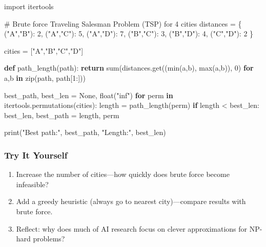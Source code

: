 \documentclass[
  letterpaper,
  DIV=11,
  numbers=noendperiod]{scrreprt}
\newenvironment{Shaded}{\begin{snugshade}}{\end{snugshade}}
\newcommand{\BuiltInTok}[1]{\textcolor[rgb]{0.00,0.23,0.31}{#1}}
\newcommand{\CommentTok}[1]{\textcolor[rgb]{0.37,0.37,0.37}{#1}}
\newcommand{\ControlFlowTok}[1]{\textcolor[rgb]{0.00,0.23,0.31}{\textbf{#1}}}
\newcommand{\DecValTok}[1]{\textcolor[rgb]{0.68,0.00,0.00}{#1}}
\newcommand{\ImportTok}[1]{\textcolor[rgb]{0.00,0.46,0.62}{#1}}
\newcommand{\KeywordTok}[1]{\textcolor[rgb]{0.00,0.23,0.31}{\textbf{#1}}}
\newcommand{\NormalTok}[1]{\textcolor[rgb]{0.00,0.23,0.31}{#1}}
\newcommand{\OperatorTok}[1]{\textcolor[rgb]{0.37,0.37,0.37}{#1}}
\newcommand{\StringTok}[1]{\textcolor[rgb]{0.13,0.47,0.30}{#1}}
\newcommand{\VariableTok}[1]{\textcolor[rgb]{0.07,0.07,0.07}{#1}}
\providecommand{\tightlist}{%
  \setlength{\itemsep}{0pt}\setlength{\parskip}{0pt}}
\begin{document}
\begin{Shaded}
\begin{Highlighting}[]
\ImportTok{import}\NormalTok{ itertools}

\CommentTok{\# Brute force Traveling Salesman Problem (TSP) for 4 cities}
\NormalTok{distances }\OperatorTok{=}\NormalTok{ \{}
\NormalTok{    (}\StringTok{"A"}\NormalTok{,}\StringTok{"B"}\NormalTok{): }\DecValTok{2}\NormalTok{, (}\StringTok{"A"}\NormalTok{,}\StringTok{"C"}\NormalTok{): }\DecValTok{5}\NormalTok{, (}\StringTok{"A"}\NormalTok{,}\StringTok{"D"}\NormalTok{): }\DecValTok{7}\NormalTok{,}
\NormalTok{    (}\StringTok{"B"}\NormalTok{,}\StringTok{"C"}\NormalTok{): }\DecValTok{3}\NormalTok{, (}\StringTok{"B"}\NormalTok{,}\StringTok{"D"}\NormalTok{): }\DecValTok{4}\NormalTok{,}
\NormalTok{    (}\StringTok{"C"}\NormalTok{,}\StringTok{"D"}\NormalTok{): }\DecValTok{2}
\NormalTok{\}}

\NormalTok{cities }\OperatorTok{=}\NormalTok{ [}\StringTok{"A"}\NormalTok{,}\StringTok{"B"}\NormalTok{,}\StringTok{"C"}\NormalTok{,}\StringTok{"D"}\NormalTok{]}

\KeywordTok{def}\NormalTok{ path\_length(path):}
    \ControlFlowTok{return} \BuiltInTok{sum}\NormalTok{(distances.get((}\BuiltInTok{min}\NormalTok{(a,b), }\BuiltInTok{max}\NormalTok{(a,b)), }\DecValTok{0}\NormalTok{) }\ControlFlowTok{for}\NormalTok{ a,b }\KeywordTok{in} \BuiltInTok{zip}\NormalTok{(path, path[}\DecValTok{1}\NormalTok{:]))}

\NormalTok{best\_path, best\_len }\OperatorTok{=} \VariableTok{None}\NormalTok{, }\BuiltInTok{float}\NormalTok{(}\StringTok{"inf"}\NormalTok{)}
\ControlFlowTok{for}\NormalTok{ perm }\KeywordTok{in}\NormalTok{ itertools.permutations(cities):}
\NormalTok{    length }\OperatorTok{=}\NormalTok{ path\_length(perm)}
    \ControlFlowTok{if}\NormalTok{ length }\OperatorTok{\textless{}}\NormalTok{ best\_len:}
\NormalTok{        best\_len, best\_path }\OperatorTok{=}\NormalTok{ length, perm}

\BuiltInTok{print}\NormalTok{(}\StringTok{"Best path:"}\NormalTok{, best\_path, }\StringTok{"Length:"}\NormalTok{, best\_len)}
\end{Highlighting}
\end{Shaded}

\subsubsection{Try It Yourself}\label{try-it-yourself-34}

\begin{enumerate}
\def\labelenumi{\arabic{enumi}.}
\tightlist
\item
  Increase the number of cities---how quickly does brute force become
  infeasible?
\item
  Add a greedy heuristic (always go to nearest city)---compare results
  with brute force.
\item
  Reflect: why does much of AI research focus on clever approximations
  for NP-hard problems?
\end{enumerate}
\end{document}
